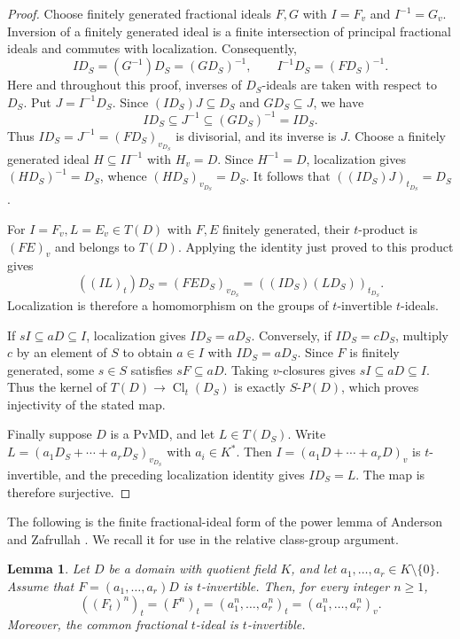 \documentclass[11pt]{amsart}
\newtheorem{lemma}[theorem]{Lemma}
\theoremstyle{definition}
\theoremstyle{remark}
\DeclareMathOperator{\Cl}{Cl}
\begin{document}
\begin{proof}
Choose finitely generated fractional ideals $F,G$ with
$I=F_v$ and $I^{-1}=G_v$. Inversion of a finitely generated ideal
is a finite intersection of principal fractional ideals and commutes
with localization. Consequently,
\[
 ID_S=(G^{-1})D_S=(GD_S)^{-1},\qquad
 I^{-1}D_S=(FD_S)^{-1}.
\]
Here and throughout this proof, inverses of $D_S$-ideals are taken
with respect to $D_S$. Put $J=I^{-1}D_S$. Since
$(ID_S)J\subseteq D_S$ and $GD_S\subseteq J$, we have
\[
 ID_S\subseteq J^{-1}\subseteq(GD_S)^{-1}=ID_S.
\]
Thus $ID_S=J^{-1}=(FD_S)_{v_{D_S}}$ is divisorial, and its inverse
is $J$. Choose a finitely generated ideal $H\subseteq II^{-1}$
with $H_v=D$. Since $H^{-1}=D$, localization gives
$(HD_S)^{-1}=D_S$, whence $(HD_S)_{v_{D_S}}=D_S$.
It follows that $((ID_S)J)_{t_{D_S}}=D_S$.

For $I=F_v,L=E_v\in T(D)$ with $F,E$ finitely generated,
their $t$-product is $(FE)_v$ and belongs to $T(D)$. Applying
the identity just proved to this product gives
\[
 ((IL)_t)D_S=(FED_S)_{v_{D_S}}
            =((ID_S)(LD_S))_{t_{D_S}}.
\]
Localization is therefore a homomorphism on the groups of
$t$-invertible $t$-ideals.

If $sI\subseteq aD\subseteq I$, localization gives $ID_S=aD_S$.
Conversely, if $ID_S=cD_S$, multiply $c$ by an element of $S$
to obtain $a\in I$ with $ID_S=aD_S$. Since $F$ is finitely
generated, some $s\in S$ satisfies $sF\subseteq aD$.
Taking $v$-closures gives $sI\subseteq aD\subseteq I$.
Thus the kernel of $T(D)\to\Cl_t(D_S)$ is exactly $S\text{-}P(D)$,
which proves injectivity of the stated map.

Finally suppose $D$ is a PvMD, and let $L\in T(D_S)$.
Write $L=(a_1D_S+\cdots+a_rD_S)_{v_{D_S}}$ with $a_i\in K^\ast$.
Then $I=(a_1D+\cdots+a_rD)_v$ is $t$-invertible, and the
preceding localization identity gives $ID_S=L$. The map is
therefore surjective.
\end{proof}

The following is the finite fractional-ideal form of the power
lemma of Anderson and Zafrullah \cite[Lemma~3.3]{AZ-Bez}.
We recall it for use in the relative class-group argument.

\begin{lemma}\label{l:t-invertible-powers}
Let $D$ be a domain with quotient field $K$, and let
$a_1,\ldots,a_r\in K\setminus\{0\}$. Assume that
$F=(a_1,\ldots,a_r)D$ is $t$-invertible. Then, for every
integer $n\geq1$,
\[
 ((F_t)^n)_t=(F^n)_t
 =(a_1^n,\ldots,a_r^n)_t
 =(a_1^n,\ldots,a_r^n)_v.
\]
Moreover, the common fractional $t$-ideal is $t$-invertible.
\end{lemma}
\end{document}
